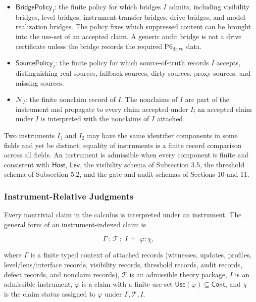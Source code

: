 \documentclass[11pt]{article}
\theoremstyle{definition}
\begin{document}
\begin{itemize}
  \(\mathsf{Level}_I\in\mathsf{Lev}\): the level annotation of \(I\). An instrument operates at a single level; cross-level operation requires an explicit level bridge inside the instrument's claim record.
\item
  \(\mathsf{BridgePolicy}_I\): the finite policy for which bridges \(I\) admits, including visibility bridges, level bridges, instrument-transfer bridges, drive bridges, and model-realization bridges. The policy fixes which suppressed content can be brought into the use-set of an accepted claim. A generic audit bridge is not a drive certificate unless the bridge records the required \(\mathrm{P6}_{\mathrm{drive}}\) data.
\item
  \(\mathsf{SourcePolicy}_I\): the finite policy for which source-of-truth records \(I\) accepts, distinguishing real sources, fallback sources, dirty sources, proxy sources, and missing sources.
\item
  \(\mathcal N_I\): the finite nonclaim record of \(I\). The nonclaims of \(I\) are part of the instrument and propagate to every claim accepted under \(I\); an accepted claim under \(I\) is interpreted with the nonclaims of \(I\) attached.
\end{itemize}

Two instruments \(I_1\) and \(I_2\) may have the same identifier components in some fields and yet be distinct; equality of instruments is a finite record comparison across all fields. An instrument is admissible when every component is finite and consistent with \(\mathsf{Host}\), \(\mathsf{Lev}\), the visibility schema of Subsection 3.5, the threshold schema of Subsection 5.2, and the gate and audit schemas of Sections 10 and 11.

\subsubsection{Instrument-Relative Judgments}

Every nontrivial claim in the calculus is interpreted under an instrument. The general form of an instrument-indexed claim is

\[
\Gamma\,;\;\mathcal T\,;\;I\;\vdash\;\varphi:\chi,
\]

where \(\Gamma\) is a finite typed context of attached records (witnesses, updates, profiles, level/lens/interface records, visibility records, threshold records, audit records, defect records, and nonclaim records), \(\mathcal T\) is an admissible theory package, \(I\) is an admissible instrument, \(\varphi\) is a claim with a finite use-set \(\mathsf{Use}(\varphi)\subseteq\mathsf{Cont}\), and \(\chi\) is the claim status assigned to \(\varphi\) under \(\Gamma,\mathcal T,I\).
\end{document}
